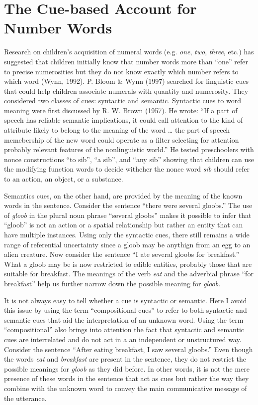 \documentclass[oneside]{report}
\theoremstyle{definition}
\theoremstyle{definition}
\theoremstyle{definition}
\theoremstyle{remark}
\begin{document}
\section{The Cue-based Account for Number
Words}\label{the-cue-based-account-for-number-words}

Research on children's acquisition of numeral words (e.g. \emph{one},
\emph{two}, \emph{three}, etc.) has suggested that children initially
know that number words more than ``one'' refer to precise numerosities
but they do not know exactly which number refers to which word (Wynn,
1992). P. Bloom \& Wynn (1997) searched for linguistic cues that could
help children associate numerals with quantity and numerosity. They
considered two classes of cues: syntactic and semantic. Syntactic cues
to word meaning were first discussed by R. W. Brown (1957). He wrote:
``If a part of speech has reliable semantic implications, it could call
attention to the kind of attribute likely to belong to the meaning of
the word \ldots{} the part of speech memebership of the new word could
operate as a filter selecting for attention probably relevant features
of the nonlinguistic world.'' He tested preschoolers with nonce
constructions ``to sib'', ``a sib'', and ``any sib'' showing that
children can use the modifying function words to decide witheher the
nonce word \emph{sib} should refer to an action, an object, or a
substance.

Semantics cues, on the other hand, are provided by the meaning of the
known words in the sentence. Consider the sentence ``there were several
gloobs.'' The use of \emph{gloob} in the plural noun phrase ``several
gloobs'' makes it possible to infer that ``gloob'' is not an action or a
spatial relationship but rather an entity that can have multiple
instances. Using only the syntactic cues, there still remains a wide
range of referential uncertainty since a gloob may be anythign from an
egg to an alien creature. Now consider the sentence ``I ate several
gloobs for breakfast.'' What a gloob may be is now restricted to edible
entities, probably those that are suitable for breakfast. The meanings
of the verb \emph{eat} and the adverbial phrase ``for breakfast'' help
us further narrow down the possible meaning for \emph{gloob}.

It is not always easy to tell whether a cue is syntactic or semantic.
Here I avoid this issue by using the term ``compositional cues'' to
refer to both syntactic and semantic cues that aid the interpretation of
an unknown word. Using the term ``compositional'' also brings into
attention the fact that syntactic and semantic cues are interrelated and
do not act in a an independent or unstructured way. Consider the
sentence ``After eating breakfast, I saw several gloobs.'' Even though
the words \emph{eat} and \emph{breakfast} are present in the sentence,
they do not restrict the possible meanings for \emph{gloob} as they did
before. In other words, it is not the mere presence of these words in
the sentence that act as cues but rather the way they combine with the
unknown word to convey the main communicative message of the utterance.
\end{document}
